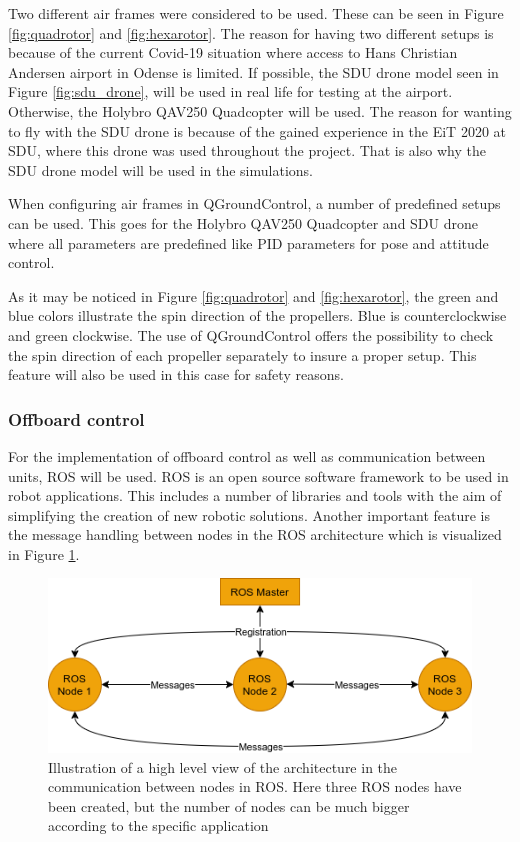 \documentclass[../Head/report.tex]{subfiles}
\begin{document}
Two different air frames were considered to be used. These can be seen in Figure \ref{fig:quadrotor} and \ref{fig:hexarotor}. The reason for having two different setups is because of the current Covid-19 situation where access to Hans Christian Andersen airport in Odense is limited. If possible, the SDU drone model seen in Figure \ref{fig:sdu_drone}, will be used in real life for testing at the airport. Otherwise, the Holybro QAV250 Quadcopter will be used. The reason for wanting to fly with the SDU drone is because of the gained experience in the EiT 2020 at SDU, where this drone was used throughout the project. That is also why the SDU drone model will be used in the simulations. 

When configuring air frames in QGroundControl, a number of predefined setups can be used. This goes for the Holybro QAV250 Quadcopter and SDU drone where all parameters are predefined like PID parameters for pose and attitude control.

As it may be noticed in Figure \ref{fig:quadrotor} and \ref{fig:hexarotor}, the green and blue colors illustrate the spin direction of the propellers. Blue is counterclockwise and green clockwise. The use of QGroundControl offers the possibility to check the spin direction of each propeller separately to insure a proper setup. This feature will also be used in this case for safety reasons.  

 
\subsubsection{Offboard control}
\label{sec:offboard_control}

For the implementation of offboard control as well as communication between units, ROS will be used. ROS is an open source software framework to be used in robot applications. This includes a number of libraries and tools with the aim of simplifying the creation of new robotic solutions. Another important feature is the message handling between nodes in the ROS architecture which is visualized in Figure \ref{fig:ros}.

\begin{figure}[H]
    \centering
    \includegraphics[width=0.50\linewidth]{../Figures/ros.png}
    \caption{Illustration of a high level view of the architecture in the communication between nodes in ROS. Here three ROS nodes have been created, but the number of nodes can be much bigger according to the specific application}
    \label{fig:ros}
\end{figure}
\end{document}
